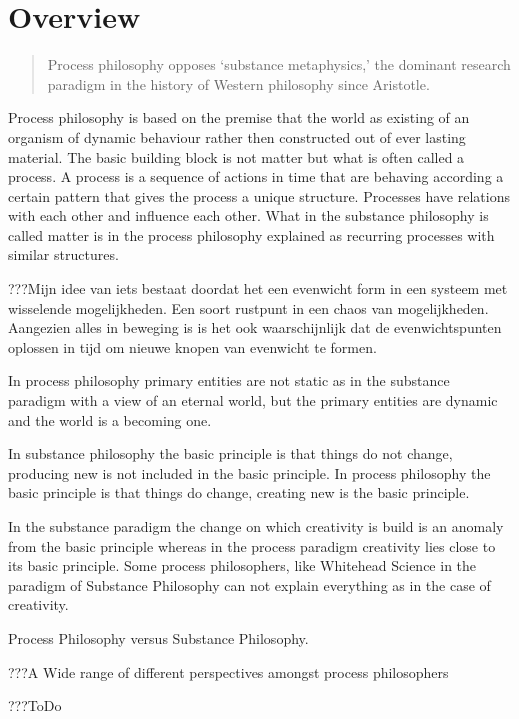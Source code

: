 \documentclass[a4paper]{Thesis}
\begin{document}
\section{Overview}


\begin{quotation}
	Process philosophy opposes ‘substance metaphysics,’ the dominant research paradigm in the history of Western philosophy since Aristotle. 
\end{quotation}
\cite{Seibt2013}

Process philosophy is based on the premise that the world as existing of an organism of dynamic behaviour rather then constructed out of ever lasting material. The basic building block is not matter but what is often called a process. A process is a sequence of actions in time that are behaving according a certain pattern that gives the process a unique structure. Processes have relations with each other and influence each other. What in the substance philosophy is called matter is in the process philosophy explained as recurring processes with similar structures.

???Mijn idee van iets bestaat doordat het een evenwicht form in een systeem met wisselende mogelijkheden. Een soort rustpunt in een chaos van mogelijkheden.
Aangezien alles in beweging is is het ook waarschijnlijk dat de evenwichtspunten oplossen in tijd om nieuwe knopen van evenwicht te formen.

In process philosophy primary entities are not static as in the substance paradigm with a view of an eternal world, but the primary entities are dynamic and the world is a becoming one.

In substance philosophy the basic principle is that things do not change, producing new is not included in the basic principle.
In process philosophy the basic principle is that things do change, creating new is the basic principle.

In the substance paradigm the change on which creativity is build is an anomaly from the basic principle whereas in the process paradigm creativity lies close to its basic principle. Some process philosophers, like Whitehead \cite{whitehead1929process} Science in the paradigm of Substance Philosophy can not explain everything as in the case of creativity.

Process Philosophy versus Substance Philosophy.

???A Wide range of different  perspectives amongst process philosophers

???ToDo
\end{document}
